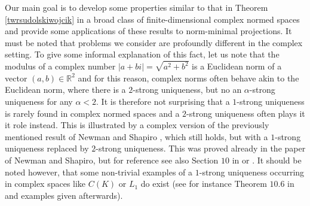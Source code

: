 \documentclass[12pt, reqno]{amsart}
\theoremstyle{definition}
\theoremstyle{remark}
\numberwithin{equation}{section}
\begin{document}
Our main goal is to develop some properties similar to that in Theorem \ref{twrsudolskiwojcik} in a broad class of finite-dimensional complex normed spaces and provide some applications of these results to norm-minimal projections. It must be noted that problems we consider are profoundly different in the complex setting. To give some informal explanation of this fact, let us note that the modulus of a complex number $|a+bi|=\sqrt{a^2+b^2}$ is a Euclidean norm of a vector $(a, b) \in \mathbb{R}^2$ and for this reason, complex norms often behave akin to the Euclidean norm, where there is a $2$-strong uniqueness, but no an $\alpha$-strong uniqueness for any $\alpha<2$. It is therefore not surprising that a $1$-strong uniqueness is rarely found in complex normed spaces and a $2$-strong uniqueness often plays it it role instead. This is illustrated by a complex version of the previously mentioned result of Newman and Shapiro \cite{newmanshapiro}, which still holds, but with a $1$-strong uniqueness replaced by $2$-strong uniqueness. This was proved already in the paper of Newman and Shapiro, but for reference see also Section $10$ in \cite{survey} or \cite{smarzewski}. It should be noted however, that some non-trivial examples of a $1$-strong uniqueness occurring in complex spaces like $C(K)$ or $L_1$ do exist (see for instance Theorem $10.6$ in \cite{survey} and examples given afterwards).
\end{document}

